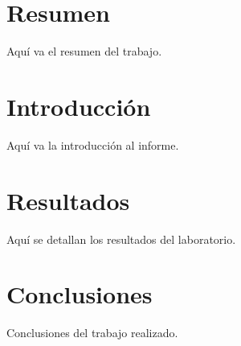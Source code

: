 \documentclass[a4paper,12pt]{article}
\begin{document}


\section*{Resumen}
Aquí va el resumen del trabajo.

\section*{Introducción}
Aquí va la introducción al informe.

\section*{Resultados}
Aquí se detallan los resultados del laboratorio.

\section*{Conclusiones}
Conclusiones del trabajo realizado.
\end{document}
